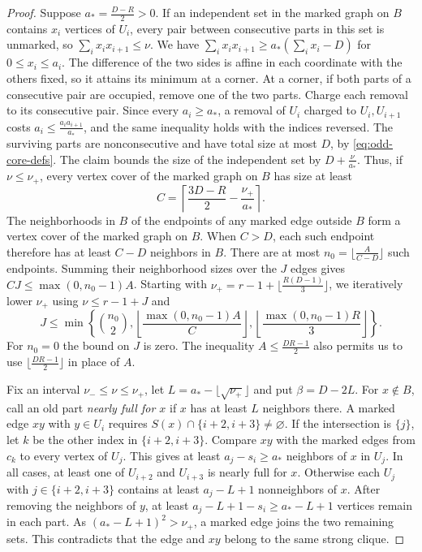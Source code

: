 \documentclass[preprint,11pt,numbers]{elsarticle-arxiv}
\numberwithin{equation}{section}
\theoremstyle{definition}
\begin{document}
\begin{proof}
Suppose $a_*=\frac{D-R}{2}>0$. If an independent set in the marked
graph on $B$ contains $x_i$ vertices of $U_i$, every pair between
consecutive parts in this set is unmarked, so $\sum_i x_ix_{i+1}\leq \nu$.
We have $\sum_i x_ix_{i+1}\geq a_*(\sum_i x_i-D)$ for
$0\leq x_i\leq a_i$. The difference of the two sides is affine in each
coordinate with the others fixed, so it attains its minimum at a corner.
At a corner, if both parts of a consecutive pair are occupied, remove
one of the two parts. Charge each removal to its consecutive pair.
Since every $a_i\geq a_*$, a removal of $U_i$ charged to $U_i,U_{i+1}$
costs $a_i\leq\frac{a_ia_{i+1}}{a_*}$, and the same inequality holds
with the indices reversed. The surviving parts are nonconsecutive
and have total size at most $D$, by \eqref{eq:odd-core-defs}.
The claim bounds the size of the independent set by $D+\frac{\nu}{a_*}$.
Thus, if $\nu\leq \nu_+$, every vertex cover of the marked graph on $B$
has size at least
\[
 C=\left\lceil \frac{3D-R}{2}-\frac{\nu_+}{a_*}\right\rceil.
\]
The neighborhoods in $B$ of the endpoints of any marked edge
outside $B$ form a vertex cover of the marked graph on $B$.
When $C>D$, each such endpoint therefore has at least $C-D$
neighbors in $B$. There are at most
$n_0=\bigl\lfloor\frac{A}{C-D}\bigr\rfloor$ such endpoints. Summing their
neighborhood sizes over the $J$ edges gives $CJ\leq\max(0,n_0-1)A$.
Starting with
$\nu_+=r-1+\lfloor \frac{R(D-1)}{3}\rfloor$, we iteratively lower $\nu_+$ using
$\nu\leq r-1+J$ and
\[
 J\leq \min\left\{\binom{n_0}{2},
       \left\lfloor\frac{\max(0,n_0-1)A}{C}\right\rfloor,
       \left\lfloor\frac{\max(0,n_0-1)R}{3}\right\rfloor\right\}.
\]
For $n_0=0$ the bound on $J$ is zero. The inequality $A\leq\frac{DR-1}{2}$ also permits us to use
$\lfloor\frac{DR-1}{2}\rfloor$ in place of $A$.

Fix an interval $\nu_-\leq \nu\leq \nu_+$, let
$L=a_*-\lfloor\sqrt{\nu_+}\rfloor$ and put $\beta=D-2L$.
For $x\notin B$, call an old part \emph{nearly full for $x$} if
$x$ has at least $L$ neighbors there. A marked edge $xy$ with $y\in U_i$
requires
$S(x)\cap\{i+2,i+3\}\ne\varnothing$. If the intersection is
$\{j\}$, let $k$ be the other index in $\{i+2,i+3\}$. Compare
$xy$ with the marked edges from $c_k$ to every vertex of $U_j$. This gives at least $a_j-s_i\geq a_*$ neighbors
of $x$ in $U_j$. In all cases, at least one of $U_{i+2}$ and $U_{i+3}$
is nearly full for $x$. Otherwise each $U_j$ with
$j\in\{i+2,i+3\}$ contains at least $a_j-L+1$ nonneighbors of $x$.
After removing the neighbors of $y$, at least $a_j-L+1-s_i\geq
a_*-L+1$ vertices remain in each part. As
$(a_*-L+1)^2>\nu_+$, a marked edge joins the two remaining sets.
This contradicts that the edge and $xy$ belong to the same strong clique.


\end{proof}
\end{document}
